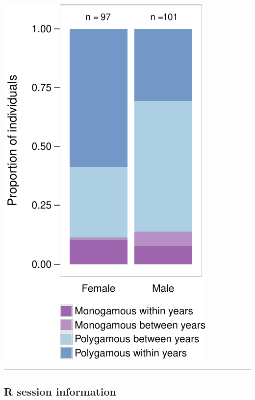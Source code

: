 \documentclass[]{article}
\begin{document}
\begin{center}\includegraphics{Ceuta_ASR_Matrix_Modeling_files/figure-latex/unnamed-chunk-90-1} \end{center}

\begin{center}\rule{0.5\linewidth}{\linethickness}\end{center}

\subsection{R session information}\label{r-session-information}
\end{document}
